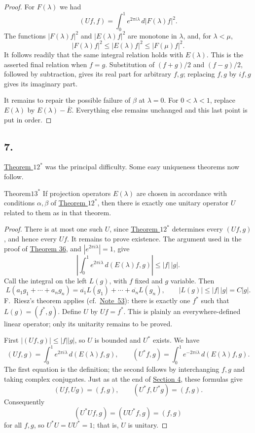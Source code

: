 ﻿\documentclass[paper=b5,fontsize=13pt,bookmarkpackage=false,twoside]{scrartcl}
\begin{document}
\begin{proof}
For \(F(\lambda)\) we had
\[
  (Uf,f)=\int_0^1 e^{2\pi i\lambda}\,d|F(\lambda)f|^2.
\]
The functions \(|F(\lambda)f|^2\) and \(|E(\lambda)f|^2\) are monotone
in \(\lambda\), and, for \(\lambda<\mu\),
\[
  |F(\lambda)f|^2
  \leq|E(\lambda)f|^2
  \leq|F(\mu)f|^2.
\]
It follows readily that the same integral relation holds with
\(E(\lambda)\).  This is the asserted final relation when \(f=g\).
Substitution of \((f+g)/2\) and \((f-g)/2\), followed by subtraction,
gives its real part for arbitrary \(f,g\); replacing \(f,g\) by \(if,g\)
gives its imaginary part.

It remains to repair the possible failure of \(\beta\) at
\(\lambda=0\).  For \(0<\lambda<1\), replace \(E(\lambda)\) by
\(E(\lambda)-\overline E\).  Everything else remains unchanged and
this last point is put in order.
\end{proof}

\subsection*{7.}
\label{appII:7}

\hyperref[thm:appII-12]{Theorem \(12^*\)} was the principal
difficulty.  Some easy uniqueness theorems now follow.

\begin{namedstatement}{Theorem}{\(13^*\)}
\label{thm:appII-13}
If projection operators \(E(\lambda)\) are chosen in accordance with
conditions \(\alpha,\beta\) of \hyperref[thm:appII-12]{Theorem \(12^*\)}, then there is exactly
one unitary operator \(U\) related to them as in that theorem.
\end{namedstatement}

\begin{proof}
There is at most one such \(U\), since
\hyperref[thm:appII-12]{Theorem \(12^*\)} determines every
\((Uf,g)\), and hence every \(Uf\).  It remains to prove existence.
The argument used in the proof of \hyperref[thm:36]{Theorem 36}, and
\(|e^{2\pi i\lambda}|=1\), give
\[
  \left|
  \int_0^1e^{2\pi i\lambda}\,d(E(\lambda)f,g)
  \right|
  \leq |f|\,|g|.
\]
Call the integral on the left \(L(g)\), with \(f\) fixed and \(g\)
variable.  Then
\[
  L(a_1g_1+\cdots+a_ng_n)
  =\overline{a_1}L(g_1)+\cdots+\overline{a_n}L(g_n),
  \qquad
  |L(g)|\leq|f|\,|g|=C|g|.
\]
F.~Riesz's theorem applies (cf.\ \hyperref[fn:53]{Note~53}): there is exactly one \(f^*\)
such that \(L(g)=(f^*,g)\).  Define \(U\) by \(Uf=f^*\).  This is plainly
an everywhere-defined linear operator; only its unitarity remains to be
proved.

First \(|(Uf,g)|\leq|f||g|\), so \(U\) is bounded and \(U^*\) exists.
We have
\[
  (Uf,g)=\int_0^1e^{2\pi i\lambda}\,d(E(\lambda)f,g),
  \qquad
  (U^*f,g)=\int_0^1e^{-2\pi i\lambda}\,d(E(\lambda)f,g).
\]
The first equation is the definition; the second follows by
interchanging \(f,g\) and taking complex conjugates.  Just as at the
end of \hyperref[appII:4]{Section 4}, these formulas give
\[
  (Uf,Ug)=(f,g),\qquad (U^*f,U^*g)=(f,g).
\]
Consequently
\[
  (U^*Uf,g)=(UU^*f,g)=(f,g)
\]
for all \(f,g\), so \(U^*U=UU^*=1\); that is, \(U\) is unitary.
\end{proof}
\end{document}

